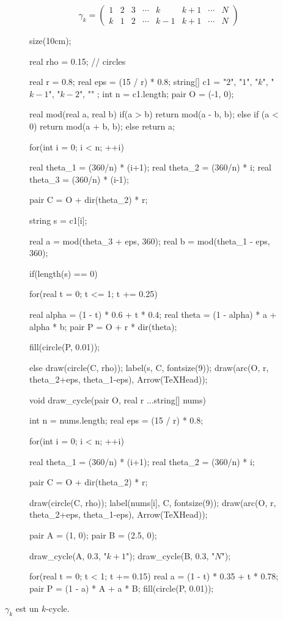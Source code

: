 \begin{exm}
	\[
		\gamma_k = \begin{pmatrix}
			1&2&3&\cdots&k&k+1&\cdots&N\\
			k&1&2&\cdots&k-1&k+1&\cdots&N
		\end{pmatrix}
	\] 

	\begin{figure}[H]
		\centering

		\begin{asy}
			size(10cm);

			real rho = 0.15; // circles

			real r = 0.8;
			real eps = (15 / r) * 0.8;
			string[] c1 = {"$2$", "$1$", "$k$", "\tiny$k-1$", "\tiny$k-2$", "" };
			int n = c1.length;
			pair O = (-1, 0);

			real mod(real a, real b) {
				if(a > b) {
					return mod(a - b, b);
				} else if (a < 0) {
					return mod(a + b, b);
				} else {
					return a;
				}
			}

			for(int i = 0; i < n; ++i) {
				real theta_1 = (360/n) * (i+1);
				real theta_2 = (360/n) * i;
				real theta_3 = (360/n) * (i-1);

				pair C = O + dir(theta_2) * r;

				string s = c1[i];

				real a = mod(theta_3 + eps, 360);
				real b = mod(theta_1 - eps, 360);

				if(length(s) == 0) {
					for(real t = 0; t <= 1; t += 0.25) {
						real alpha = (1 - t) * 0.6 + t * 0.4;
						real theta = (1 - alpha) * a + alpha * b;
						pair P = O + r * dir(theta);

						fill(circle(P, 0.01));
					}
				} else {
					draw(circle(C, rho));
					label(s, C, fontsize(9));
				}
				draw(arc(O, r, theta_2+eps, theta_1-eps), Arrow(TeXHead));
			}


			void draw_cycle(pair O, real r ...string[] nums) {
				int n = nums.length;
				real eps = (15 / r) * 0.8;

				for(int i = 0; i < n; ++i) {
					real theta_1 = (360/n) * (i+1);
					real theta_2 = (360/n) * i;

					pair C = O + dir(theta_2) * r;

					draw(circle(C, rho));
					label(nums[i], C, fontsize(9));
					draw(arc(O, r, theta_2+eps, theta_1-eps), Arrow(TeXHead));
				}
			}

			pair A = (1, 0);
			pair B = (2.5, 0);

			draw_cycle(A, 0.3, "\tiny$k+1$");
			draw_cycle(B, 0.3, "$N$");

			for(real t = 0; t < 1; t += 0.15) {
				real a = (1 - t) * 0.35 + t * 0.78;
				pair P = (1 - a) * A + a * B;
				fill(circle(P, 0.01));
			}
		\end{asy}
	\end{figure}

	$\gamma_k$ est un $k$-cycle.
\end{exm}

